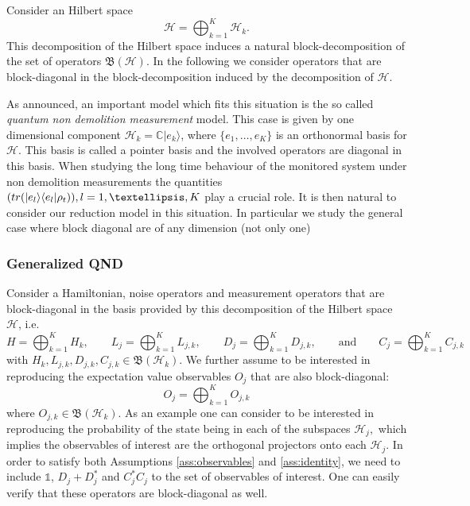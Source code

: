 \documentclass[aihp,12pt]{imsart}
\newcommand{\Hc}{\mathcal{H}}
\newcommand{\Bf}{\mathfrak{B}}
\newcommand{\one}{\mathbb{1}}
\newcommand{\tr}{{\rm tr}}
\theoremstyle{theorem}
\theoremstyle{definition}
\theoremstyle{remark}
\begin{document}
Consider an Hilbert space $$\Hc=\bigoplus_{k=1}^K \Hc_k.$$ This decomposition of the Hilbert space induces a natural block-decomposition of the set of operators $\Bf(\Hc)$. In the following we consider operators that are block-diagonal in the block-decomposition induced by the decomposition of $\Hc$.

As announced, an important model which fits this situation is the so called \emph{quantum non demolition measurement} model. This case is given by one dimensional component $\mathcal H_k=\mathbb C\vert e_k\rangle$, where $\{e_1,\ldots,e_K\}$ is an orthonormal basis for $\Hc$. This basis is called a pointer basis and the involved operators are diagonal in this basis. When studying the long time behaviour of the monitored system under non demolition measurements the quantities $(\tr(\vert e_l\rangle\langle e_l\vert\rho_t)), l=1,\ldots,K$ play a crucial role. It is then natural to consider our reduction model in this situation. In particular we study the general case where block diagonal are of any dimension (not only one)  



\subsubsection{Generalized QND}

Consider a Hamiltonian, noise operators and measurement operators that are block-diagonal in the basis provided by this decomposition of the Hilbert space $\Hc$, i.e. 
\[H= \bigoplus_{k=1}^K H_k, \qquad L_j= \bigoplus_{k=1}^K L_{j,k}, \qquad D_j = \bigoplus_{k=1}^K D_{j,k}, \qquad\text{and}\qquad C_j = \bigoplus_{k=1}^K C_{j,k} \]
with $H_k,L_{j,k},D_{j,k},C_{j,k}\in\Bf(\Hc_k)$.
We further assume to be interested in reproducing the expectation value observables $O_j$ that are also block-diagonal:
\[O_j = \bigoplus_{k=1}^K O_{j,k}\]
where $O_{j,k}\in\Bf(\Hc_k)$. As an example one can consider to be interested in reproducing the probability of the state being in each of the subspaces $\Hc_j,$ which implies the observables of interest are the orthogonal projectors onto each $\Hc_j$. 
In order to satisfy both Assumptions \ref{ass:observables} and  \ref{ass:identity}, we need to include $\one$, $D_j+D_j^*$ and $C_j^* C_j$ to the set of observables of interest. One can easily verify that these operators are block-diagonal as well.
\end{document}

